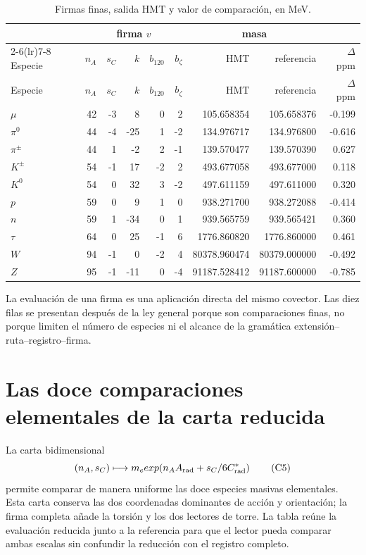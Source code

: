 \begin{longtable}{@{}lrrrrrrrr@{}}
\caption{Firmas finas, salida HMT y valor de comparación, en MeV.}
\label{tab:diez-firmas-finas-rev6}\\
\toprule
&\multicolumn{5}{c}{firma \(v\)}&
\multicolumn{2}{c}{masa}&\\
\cmidrule(lr){2-6}\cmidrule(lr){7-8}
Especie&\(n_A\)&\(s_C\)&\(k\)&\(b_{120}\)&\(b_{\zeta}\)&
{HMT}&{referencia}&{\(\Delta\) ppm}\\
\midrule
\endfirsthead
\toprule
Especie&\(n_A\)&\(s_C\)&\(k\)&\(b_{120}\)&\(b_{\zeta}\)&
{HMT}&{referencia}&{\(\Delta\) ppm}\\
\midrule
\endhead
\(\mu\)&42&-3&8&0&2&105.658354&105.658376&-0.199\\
\(\pi^0\)&44&-4&-25&1&-2&134.976717&134.976800&-0.616\\
\(\pi^\pm\)&44&1&-2&2&-1&139.570477&139.570390&0.627\\
\(K^\pm\)&54&-1&17&-2&2&493.677058&493.677000&0.118\\
\(K^0\)&54&0&32&3&-2&497.611159&497.611000&0.320\\
\(p\)&59&0&9&1&0&938.271700&938.272088&-0.414\\
\(n\)&59&1&-34&0&1&939.565759&939.565421&0.360\\
\(\tau\)&64&0&25&-1&6&1776.860820&1776.860000&0.461\\
\(W\)&94&-1&0&-2&4&80378.960474&80379.000000&-0.492\\
\(Z\)&95&-1&-11&0&-4&91187.528412&91187.600000&-0.785\\
\bottomrule
\end{longtable}

La evaluación de una firma es una aplicación directa del mismo covector. Las
diez filas se presentan después de la ley general porque son comparaciones
finas, no porque limiten el número de especies ni el alcance de la gramática
extensión--ruta--registro--firma.

\section{Las doce comparaciones elementales de la carta reducida}

La carta bidimensional
\[
(n_A,s_C)\longmapsto
m_e\exp\!\left(n_AA_{\rm rad}+\frac{s_C}{6}C^*_{\rm rad}\right)
\tag{C5}\label{eq:carta-reducida-doce-rev6}
\]
permite comparar de manera uniforme las doce especies masivas elementales.
Esta carta conserva las dos coordenadas dominantes de acción y orientación;
la firma completa añade la torsión y los dos lectores de torre. La tabla
reúne la evaluación reducida junto a la referencia para que el lector pueda
comparar ambas escalas sin confundir la reducción con el registro completo.

